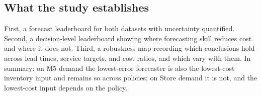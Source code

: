 \subsection{What the study establishes}
\label{sec:establishes}
First, a forecast leaderboard for both datasets with uncertainty quantified.
Second, a decision-level leaderboard showing where forecasting skill reduces
cost and where it does not. Third, a robustness map recording which
conclusions hold across lead times, service targets, and cost ratios, and
which vary with them. In summary: on M5 demand the lowest-error forecaster is
also the lowest-cost inventory input and remains so across policies; on Store
demand it is not, and the lowest-cost input depends on the policy.
